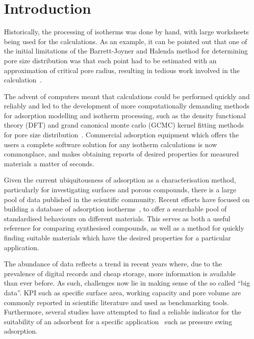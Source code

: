 
\section{Introduction}

Historically, the processing of isotherms was done by hand, with large
worksheets being used for the calculations. As an example,
it can be pointed out that one of the initial limitations of the
Barrett-Joyner and Halenda method for determining pore size distribution
was that each point had to be estimated with an approximation of critical
pore radius, resulting in tedious work involved in the
calculation~\cite{barrettDeterminationPoreVolume1951}.

The advent of computers meant that calculations could be performed
quickly and reliably and led to the development of more computationally
demanding methods for adsorption modelling and isotherm processing, such as the 
density functional theory (DFT) and grand canonical monte carlo (GCMC) kernel fitting
methods for pore size distribution~\cite{seatonNewAnalysisMethod1989,%
	tarazonaPhaseEquilibriaFluid1987}.
Commercial adsorption equipment which offers the users
a complete software solution for any isotherm calculations is now
commonplace, and makes obtaining reports of desired properties
for measured materials a matter of seconds.

Given the current ubiquitousness of adsorption as a characterisation method,
particularly for investigating surfaces and porous compounds,
there is a large pool of data published in the scientific community.
Recent efforts have focused on building a database of adsorption
isotherms~\cite{sideriusNISTARPAEDatabase2015}, to offer a searchable
pool of standardised behaviours on different materials. This serves as
both a useful reference for comparing synthesised compounds, as well as a
method for quickly finding suitable materials which have the
desired properties for a particular application.

The abundance of data reflects a trend in recent years where, due
to the prevalence of digital records and cheap storage, more
information is available than ever before. As such, challenges
now lie in making sense of the so called ``big data''.
\gls{KPI} such as specific surface area, working
capacity and pore volume are commonly reported in scientific literature
and used as benchmarking tools. Furthermore,
several studies have attempted to find a reliable indicator for
the suitability of an adsorbent for a specific
application~\cite{regeSimpleParameterSelecting2001, %
	ackley2000psa,%
	wiersumAdsorbentPerformanceIndicator2013} such as pressure swing
adsorption.

